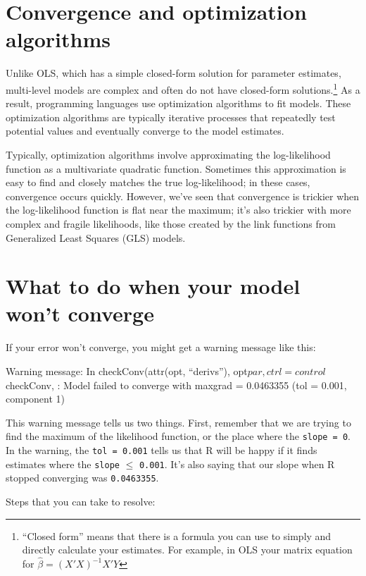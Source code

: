\documentclass[
  letterpaper,
  DIV=11,
  numbers=noendperiod]{scrreprt}
\begin{document}
\section{Convergence and optimization
algorithms}\label{convergence-and-optimization-algorithms}

Unlike OLS, which has a simple closed-form solution for parameter
estimates, multi-level models are complex and often do not have
closed-form solutions.\footnote{``Closed form'' means that there is a
  formula you can use to simply and directly calculate your estimates.
  For example, in OLS your matrix equation for
  \(\hat{\beta} = (X'X)^{-1}X'Y\)} As a result, programming languages
use optimization algorithms to fit models. These optimization algorithms
are typically iterative processes that repeatedly test potential values
and eventually converge to the model estimates.

Typically, optimization algorithms involve approximating the
log-likelihood function as a multivariate quadratic function. Sometimes
this approximation is easy to find and closely matches the true
log-likelihood; in these cases, convergence occurs quickly. However,
we've seen that convergence is trickier when the log-likelihood function
is flat near the maximum; it's also trickier with more complex and
fragile likelihoods, like those created by the link functions from
Generalized Least Squares (GLS) models.

\section{What to do when your model won't
converge}\label{what-to-do-when-your-model-wont-converge}

If your error won't converge, you might get a warning message like this:

Warning message: In checkConv(attr(opt, ``derivs''),
opt\(par, ctrl = control\)checkConv, : Model failed to converge with
max\textbar grad\textbar{} = 0.0463355 (tol = 0.001, component 1)

This warning message tells us two things. First, remember that we are
trying to find the maximum of the likelihood function, or the place
where the \texttt{slope\ =\ 0}. In the warning, the
\texttt{tol\ =\ 0.001} tells us that R will be happy if it finds
estimates where the \texttt{slope} \(\leq\) \texttt{0.001}. It's also
saying that our slope when R stopped converging was \texttt{0.0463355}.

Steps that you can take to resolve:
\end{document}
